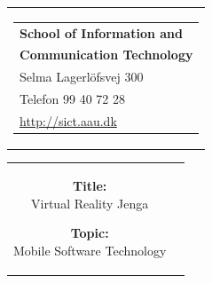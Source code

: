 


\thispagestyle{empty}

\begin{nopagebreak}
{\samepage

\begin{tabular}{r}
	\parbox{\textwidth}
	{  
		\hspace{2cm} \parbox{4.9cm}
		{
			\begin{tabular}{l}
			{\small \textbf{School of Information and}}\\
			{\small \textbf{Communication Technology}}\\
			
			{\small Selma Lagerlöfsvej 300} \\
			{\small Telefon 99 40 72 28} \\
			{\small \url{http://sict.aau.dk}}
			\end{tabular}
		}
	}
\end{tabular}

\begin{tabular}{cc}
\parbox{7cm}{

\begin{description}

\item {\textbf{Title:}}\\
Virtual Reality Jenga
\item {\textbf{Topic:}}\\
Mobile Software Technology

\end{description}

\parbox{8cm}{

}}
\end{tabular}}
\end{nopagebreak}
